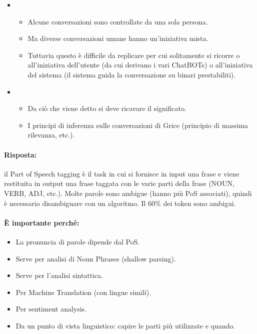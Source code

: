 \begin{itemize}
  \item {}
    \begin{itemize}
      \item Alcune conversazioni sono controllate da una sola persona. 
      \item Ma diverse conversazioni umane hanno un'iniziativa mista. 
      \item Tuttavia questo è difficile da replicare per cui solitamente si ricorre o all'iniziativa dell'utente (da cui derivano i vari ChatBOTs) o all'iniziativa del sistema (il sistema guida la conversazione su binari prestabiliti). 
    \end{itemize}
  \item {}
    \begin{itemize}
      \item Da ciò che viene detto si deve ricavare il significato. 
      \item I principi di inferenza sulle conversazioni di Grice (principio di massima rilevanza, etc.).
    \end{itemize}
\end{itemize}



\paragraph{Risposta:} il Part of Speech tagging è il task in cui si fornisce in input una frase e viene restituita in output una frase taggata con le varie parti della frase (NOUN, VERB, ADJ, etc.). Molte parole sono ambigue (hanno più PoS associati), quindi è necessario disambiguare con un algoritmo. Il 60\% dei token sono ambigui. 

\paragraph{È importante perché:}

\begin{itemize}
  \item La pronuncia di parole dipende dal PoS. 
  \item Serve per analisi di Noun Phrases (shallow parsing). 
  \item Serve per l'analisi sintattica. 
  \item Per Machine Translation (con lingue simili). 
  \item Per sentiment analysis. 
  \item Da un punto di vista linguistico: capire le parti più utilizzate e quando.
\end{itemize}

